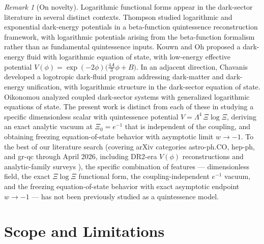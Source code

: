 \documentclass[11pt,reqno]{amsart}
\theoremstyle{plain}
\theoremstyle{definition}
\theoremstyle{remark}
\newtheorem*{remark}{Remark}
\begin{document}
\begin{remark}[On novelty]
Logarithmic functional forms appear in the dark-sector literature in
several distinct contexts. Thompson \cite{Thompson2019} studied
logarithmic and exponential dark-energy potentials in a beta-function
quintessence reconstruction framework, with logarithmic potentials
arising from the beta-function formalism rather than as fundamental
quintessence inputs. Kouwn and Oh \cite{KouwnOh2012} proposed a
dark-energy fluid with logarithmic equation of state, with low-energy
effective potential $V(\phi) = \exp(-2\phi)\bigl(\tfrac{4A}{3}\phi + B\bigr)$.
In an adjacent direction, Chavanis \cite{Chavanis2015} developed a
logotropic dark-fluid program addressing dark-matter and dark-energy
unification, with logarithmic structure in the dark-sector equation of
state. Oikonomou \cite{Oikonomou2019} analyzed coupled dark-sector
systems with generalized logarithmic equations of state. The present
work is distinct from each of these in studying a specific dimensionless
scalar with quintessence potential $V = \Lambda^{4}\,\Xi\log\Xi$,
deriving an exact analytic vacuum at $\Xi_0 = e^{-1}$ that is independent
of the coupling, and obtaining freezing equation-of-state behavior with
asymptotic limit $w \to -1$. To the best of our
literature search
(covering arXiv categories astro-ph.CO, hep-ph, and gr-qc through April
2026, including DR2-era $V(\phi)$ reconstructions and analytic-family
surveys
\cite{AdamEtAl2025,Adil2026Analytic,Wang2026QReconstruction}), the
specific combination of features --- dimensionless field, the exact
$\Xi\log\Xi$ functional form, the coupling-independent $e^{-1}$ vacuum,
and the freezing equation-of-state behavior with exact asymptotic
endpoint $w \to -1$ --- has not been previously
studied as a quintessence model.
\end{remark}

\section{Scope and Limitations}\label{sec:scope}
\end{document}
